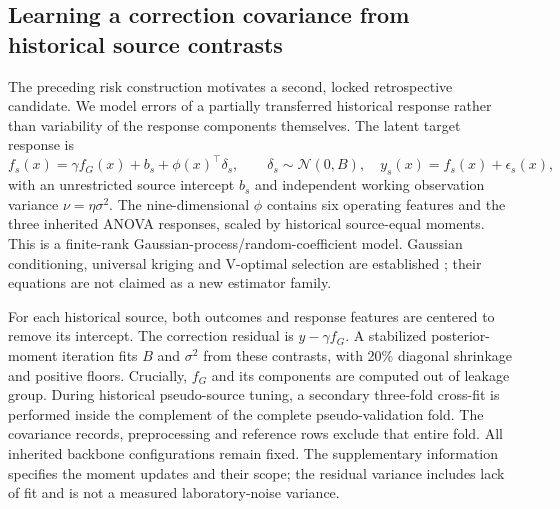 \subsection{Learning a correction covariance from historical source contrasts}
The preceding risk construction motivates a second, locked retrospective candidate. We model errors of a partially transferred historical response rather than variability of the response components themselves. The latent target response is
\begin{equation}
f_s(x)=\gamma f_G(x)+b_s+\phi(x)^\top\delta_s,\qquad
\delta_s\sim\mathcal N(0,B),\quad y_s(x)=f_s(x)+\epsilon_s(x),
\label{eq:contrastmodel}
\end{equation}
with an unrestricted source intercept $b_s$ and independent working observation variance $\nu=\eta\sigma^2$. The nine-dimensional $\phi$ contains six operating features and the three inherited ANOVA responses, scaled by historical source-equal moments. This is a finite-rank Gaussian-process/random-coefficient model. Gaussian conditioning, universal kriging and V-optimal selection are established \cite{gpml,alpaca,gpmllearn,scaml}; their equations are not claimed as a new estimator family.

For each historical source, both outcomes and response features are centered to remove its intercept. The correction residual is $y-\gamma f_G$. A stabilized posterior-moment iteration fits $B$ and $\sigma^2$ from these contrasts, with 20\% diagonal shrinkage and positive floors. Crucially, $f_G$ and its components are computed out of leakage group. During historical pseudo-source tuning, a secondary three-fold cross-fit is performed inside the complement of the complete pseudo-validation fold. The covariance records, preprocessing and reference rows exclude that entire fold. All inherited backbone configurations remain fixed. The supplementary information specifies the moment updates and their scope; the residual variance includes lack of fit and is not a measured laboratory-noise variance.

